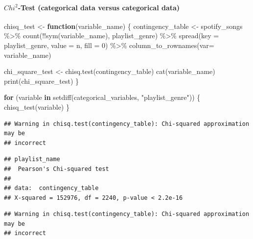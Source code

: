 \documentclass[
]{article}
\newenvironment{Shaded}{\begin{snugshade}}{\end{snugshade}}
\newcommand{\AttributeTok}[1]{\textcolor[rgb]{0.77,0.63,0.00}{#1}}
\newcommand{\ControlFlowTok}[1]{\textcolor[rgb]{0.13,0.29,0.53}{\textbf{#1}}}
\newcommand{\DecValTok}[1]{\textcolor[rgb]{0.00,0.00,0.81}{#1}}
\newcommand{\FunctionTok}[1]{\textcolor[rgb]{0.00,0.00,0.00}{#1}}
\newcommand{\NormalTok}[1]{#1}
\newcommand{\OtherTok}[1]{\textcolor[rgb]{0.56,0.35,0.01}{#1}}
\newcommand{\SpecialCharTok}[1]{\textcolor[rgb]{0.00,0.00,0.00}{#1}}
\newcommand{\StringTok}[1]{\textcolor[rgb]{0.31,0.60,0.02}{#1}}
\begin{document}
\hypertarget{chi2-test-categorical-data-versus-categorical-data}{%
\paragraph{\texorpdfstring{\(Chi^2\)-Test (categorical data versus
categorical
data)}{Chi\^{}2-Test (categorical data versus categorical data)}}\label{chi2-test-categorical-data-versus-categorical-data}}

\begin{Shaded}
\begin{Highlighting}[]
\NormalTok{chisq\_test }\OtherTok{\textless{}{-}} \ControlFlowTok{function}\NormalTok{(variable\_name) \{}
\NormalTok{  contingency\_table }\OtherTok{\textless{}{-}}\NormalTok{ spotify\_songs }\SpecialCharTok{\%\textgreater{}\%}
    \FunctionTok{count}\NormalTok{(}\SpecialCharTok{!!}\FunctionTok{sym}\NormalTok{(variable\_name), playlist\_genre) }\SpecialCharTok{\%\textgreater{}\%}
    \FunctionTok{spread}\NormalTok{(}\AttributeTok{key =}\NormalTok{ playlist\_genre, }\AttributeTok{value =}\NormalTok{ n, }\AttributeTok{fill =} \DecValTok{0}\NormalTok{) }\SpecialCharTok{\%\textgreater{}\%}
    \FunctionTok{column\_to\_rownames}\NormalTok{(}\AttributeTok{var=}\NormalTok{ variable\_name)}
  
\NormalTok{  chi\_square\_test }\OtherTok{\textless{}{-}} \FunctionTok{chisq.test}\NormalTok{(contingency\_table)}
  \FunctionTok{cat}\NormalTok{(variable\_name)}
  \FunctionTok{print}\NormalTok{(chi\_square\_test)}
\NormalTok{\}}

\ControlFlowTok{for}\NormalTok{ (variable }\ControlFlowTok{in} \FunctionTok{setdiff}\NormalTok{(categorical\_variables, }\StringTok{"playlist\_genre"}\NormalTok{)) \{}
  \FunctionTok{chisq\_test}\NormalTok{(variable)}
\NormalTok{\}}
\end{Highlighting}
\end{Shaded}

\begin{verbatim}
## Warning in chisq.test(contingency_table): Chi-squared approximation may be
## incorrect
\end{verbatim}

\begin{verbatim}
## playlist_name
##  Pearson's Chi-squared test
## 
## data:  contingency_table
## X-squared = 152976, df = 2240, p-value < 2.2e-16
\end{verbatim}

\begin{verbatim}
## Warning in chisq.test(contingency_table): Chi-squared approximation may be
## incorrect
\end{verbatim}
\end{document}
